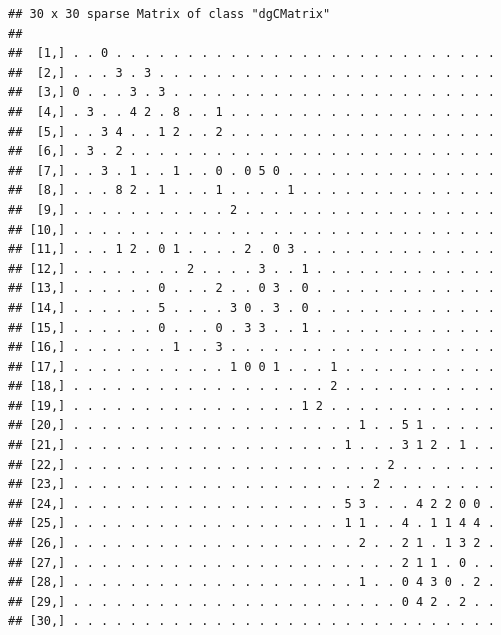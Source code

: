 \documentclass[
]{book}
\newenvironment{Shaded}{\begin{snugshade}}{\end{snugshade}}
\newcommand{\DecValTok}[1]{\textcolor[rgb]{0.00,0.00,0.81}{#1}}
\newcommand{\FunctionTok}[1]{\textcolor[rgb]{0.13,0.29,0.53}{\textbf{#1}}}
\newcommand{\NormalTok}[1]{#1}
\newcommand{\OtherTok}[1]{\textcolor[rgb]{0.56,0.35,0.01}{#1}}
\newcommand{\SpecialCharTok}[1]{\textcolor[rgb]{0.81,0.36,0.00}{\textbf{#1}}}
\theoremstyle{definition}
\theoremstyle{definition}
\theoremstyle{definition}
\theoremstyle{definition}
\theoremstyle{remark}
\begin{document}
\begin{Shaded}
\end{Shaded}

\begin{verbatim}
## 30 x 30 sparse Matrix of class "dgCMatrix"
##                                                                  
##  [1,] . . 0 . . . . . . . . . . . . . . . . . . . . . . . . . . .
##  [2,] . . . 3 . 3 . . . . . . . . . . . . . . . . . . . . . . . .
##  [3,] 0 . . . 3 . 3 . . . . . . . . . . . . . . . . . . . . . . .
##  [4,] . 3 . . 4 2 . 8 . . 1 . . . . . . . . . . . . . . . . . . .
##  [5,] . . 3 4 . . 1 2 . . 2 . . . . . . . . . . . . . . . . . . .
##  [6,] . 3 . 2 . . . . . . . . . . . . . . . . . . . . . . . . . .
##  [7,] . . 3 . 1 . . 1 . . 0 . 0 5 0 . . . . . . . . . . . . . . .
##  [8,] . . . 8 2 . 1 . . . 1 . . . . 1 . . . . . . . . . . . . . .
##  [9,] . . . . . . . . . . . 2 . . . . . . . . . . . . . . . . . .
## [10,] . . . . . . . . . . . . . . . . . . . . . . . . . . . . . .
## [11,] . . . 1 2 . 0 1 . . . . 2 . 0 3 . . . . . . . . . . . . . .
## [12,] . . . . . . . . 2 . . . . 3 . . 1 . . . . . . . . . . . . .
## [13,] . . . . . . 0 . . . 2 . . 0 3 . 0 . . . . . . . . . . . . .
## [14,] . . . . . . 5 . . . . 3 0 . 3 . 0 . . . . . . . . . . . . .
## [15,] . . . . . . 0 . . . 0 . 3 3 . . 1 . . . . . . . . . . . . .
## [16,] . . . . . . . 1 . . 3 . . . . . . . . . . . . . . . . . . .
## [17,] . . . . . . . . . . . 1 0 0 1 . . . 1 . . . . . . . . . . .
## [18,] . . . . . . . . . . . . . . . . . . 2 . . . . . . . . . . .
## [19,] . . . . . . . . . . . . . . . . 1 2 . . . . . . . . . . . .
## [20,] . . . . . . . . . . . . . . . . . . . . 1 . . 5 1 . . . . .
## [21,] . . . . . . . . . . . . . . . . . . . 1 . . . 3 1 2 . 1 . .
## [22,] . . . . . . . . . . . . . . . . . . . . . . 2 . . . . . . .
## [23,] . . . . . . . . . . . . . . . . . . . . . 2 . . . . . . . .
## [24,] . . . . . . . . . . . . . . . . . . . 5 3 . . . 4 2 2 0 0 .
## [25,] . . . . . . . . . . . . . . . . . . . 1 1 . . 4 . 1 1 4 4 .
## [26,] . . . . . . . . . . . . . . . . . . . . 2 . . 2 1 . 1 3 2 .
## [27,] . . . . . . . . . . . . . . . . . . . . . . . 2 1 1 . 0 . .
## [28,] . . . . . . . . . . . . . . . . . . . . 1 . . 0 4 3 0 . 2 .
## [29,] . . . . . . . . . . . . . . . . . . . . . . . 0 4 2 . 2 . .
## [30,] . . . . . . . . . . . . . . . . . . . . . . . . . . . . . .
\end{verbatim}
\end{document}
